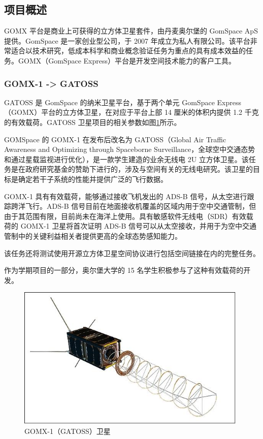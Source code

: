 \subsection{项目概述}

GOMX 平台是商业上可获得的立方体卫星套件，由丹麦奥尔堡的 GomSpace ApS 提供。GomSpace 是一家创业型公司，于 2007 年成立为私人有限公司。该平台非常适合以技术研究，低成本科学和商业概念验证任务为重点的具有成本效益的任务。GOMX（GomSpace Express）平台是开发空间技术能力的客户工具。

\subsubsection{GOMX-1 -> GATOSS}

GATOSS 是 GomSpace 的纳米卫星平台，基于两个单元 GomSpace Express（GOMX）平台的立方体卫星，在对应于平台上部 14 厘米的体积内提供 1.2 千克的有效载荷。GATOSS 卫星项目的相关参数如图\ref{fig:GATOSS_AutoD}所示。

GOMSpace 的 GOMX-1 在发布后改名为 GATOSS（Global Air Traffic Awareness and Optimizing through Spaceborne Surveillance，全球空中交通态势和通过星载监视进行优化），是一款学生建造的业余无线电 2U 立方体卫星。该任务是在政府研究基金的赞助下进行的，涉及与空间有关的无线电研究。该卫星的目标是确定若干子系统的性能并提供广泛的飞行数据。

GOMX-1 具有有效载荷，能够通过接收飞机发出的 ADS-B 信号，从太空进行跟踪跨洋飞行。ADS-B 信号目前在地面接收机覆盖的区域内用于空中交通管制，但由于其范围有限，目前尚未在海洋上使用。具有敏感软件无线电（SDR）有效载荷的 GOMX-1 卫星将首次证明 ADS-B 信号可以从太空接收，并用于为空中交通管制中的关键利益相关者提供更高的全球态势感知能力。

该任务还将测试使用开源立方体卫星空间协议进行包括空间链接在内的完整任务。

作为学期项目的一部分，奥尔堡大学的 15 名学生积极参与了这种有效载荷的开发。

\begin{figure}[!htb]
\centering
\includegraphics[width=11cm]{pic/GATOSS_AutoD.jpeg}
\caption{GOMX-1（GATOSS）卫星\protect\footnotemark}
\label{fig:GATOSS_AutoD}
\end{figure}

